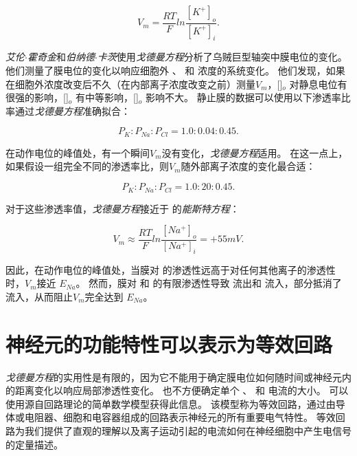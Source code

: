 \begin{equation} \label{eq:9_glial_cell_equation}
	V_m = \frac{RT}{F}
		ln \frac{[K^+]_o}{[K^+]_i}.
\end{equation}


\textit{艾伦$\cdot$霍奇金}和\textit{伯纳德$\cdot$卡茨}使用\textit{戈德曼方程}分析了乌贼巨型轴突中膜电位的变化。
他们测量了膜电位的变化以响应细胞外 、 和  浓度的系统变化。
他们发现，如果在细胞外浓度改变后不久（在内部离子浓度改变之前）测量$V_m$，[]$_o$ 对静息电位有很强的影响，[]$_o$ 有中等影响，[]$_o$ 影响不大。 
静止膜的数据可以使用以下渗透率比率通过\textit{戈德曼方程}准确拟合：

\begin{equation}
	P_K : P_{Na} : P_{Cl} = 1.0 : 0.04 : 0.45.
\end{equation}


在动作电位的峰值处，有一个瞬间$V_m$没有变化，\textit{戈德曼方程}适用。 
在这一点上，如果假设一组完全不同的渗透率比，则$V_m$随外部离子浓度的变化最合适：

\begin{equation}
	P_K : P_{Na} : P_{Cl} = 1.0 : 20 : 0.45.
\end{equation}


对于这些渗透率值，\textit{戈德曼方程}接近于  的\textit{能斯特方程}：

\begin{equation}
	V_m \approx \frac{RT}{F} 
			ln \frac{[Na^+]_o}{[Na^+]_i} =
			+ 55 mV.
\end{equation}


因此，在动作电位的峰值处，当膜对  的渗透性远高于对任何其他离子的渗透性时，$V_m$接近 $E_{Na}$。 
然而，膜对  和  的有限渗透性导致  流出和  流入，部分抵消了  流入，从而阻止$V_m$完全达到 $E_{Na}$。



\section{神经元的功能特性可以表示为等效回路}

\textit{戈德曼方程}的实用性是有限的，因为它不能用于确定膜电位如何随时间或神经元内的距离变化以响应局部渗透性变化。
也不方便确定单个 、 和  电流的大小。
可以使用源自回路理论的简单数学模型获得此信息。
该模型称为等效回路，通过由导体或电阻器、细胞和电容器组成的回路表示神经元的所有重要电气特性。
等效回路为我们提供了直观的理解以及离子运动引起的电流如何在神经细胞中产生电信号的定量描述。


